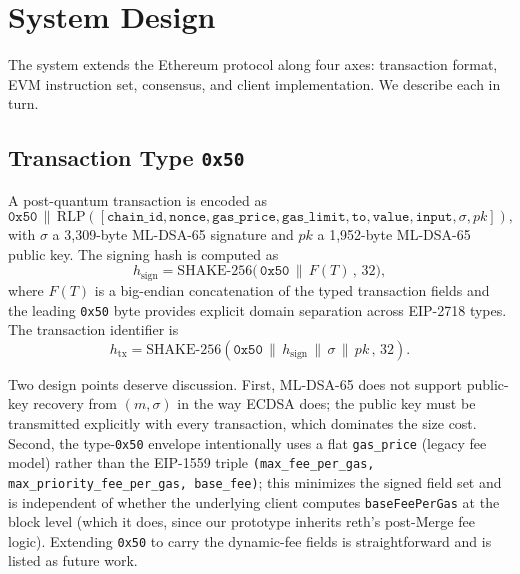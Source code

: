 \documentclass[journal,onecolumn,11pt]{IEEEtran}
\begin{document}
\section{System Design}
\label{sec:design}

The system extends the Ethereum protocol along four axes: transaction format, EVM instruction set, consensus, and client implementation. We describe each in turn.

\subsection{Transaction Type \texttt{0x50}}
\label{sec:design_tx}

A post-quantum transaction is encoded as
\[
\texttt{0x50} \,\|\, \mathrm{RLP}([\texttt{chain\_id}, \texttt{nonce}, \texttt{gas\_price}, \texttt{gas\_limit}, \texttt{to}, \texttt{value}, \texttt{input}, \sigma, \mathit{pk}]),
\]
with $\sigma$ a 3{,}309-byte ML-DSA-65 signature and $\mathit{pk}$ a 1{,}952-byte ML-DSA-65 public key. The signing hash is computed as
\begin{equation}
h_{\text{sign}} = \mathrm{SHAKE\text{-}256}\bigl(\,\texttt{0x50}\,\|\, F(T)\,,\,32\bigr),
\label{eq:sign_hash}
\end{equation}
where $F(T)$ is a big-endian concatenation of the typed transaction fields and the leading \texttt{0x50} byte provides explicit domain separation across EIP-2718 types. The transaction identifier is
\begin{equation}
h_{\text{tx}} = \mathrm{SHAKE\text{-}256}(\texttt{0x50}\,\|\, h_{\text{sign}}\,\|\,\sigma\,\|\,\mathit{pk}\,,\,32).
\label{eq:tx_hash}
\end{equation}

Two design points deserve discussion. First, ML-DSA-65 does not support public-key recovery from $(m, \sigma)$ in the way ECDSA does; the public key must be transmitted explicitly with every transaction, which dominates the size cost. Second, the type-\texttt{0x50} envelope intentionally uses a flat \texttt{gas\_price} (legacy fee model) rather than the EIP-1559 triple \texttt{(max\_fee\_per\_gas, max\_priority\_fee\_per\_gas, base\_fee)}; this minimizes the signed field set and is independent of whether the underlying client computes \texttt{baseFeePerGas} at the block level (which it does, since our prototype inherits reth's post-Merge fee logic). Extending \texttt{0x50} to carry the dynamic-fee fields is straightforward and is listed as future work.
\end{document}
